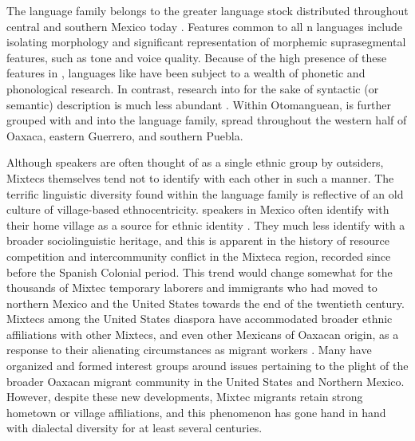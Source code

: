 \documentclass[output=paper,modfonts,nonflat]{langsci/langscibook}
\begin{document}
The  language family belongs to the greater  language stock distributed throughout central and southern Mexico today \citep{Rensch1976}.  Features common to all n languages include isolating morphology and significant representation of morphemic suprasegmental features, such as tone and voice quality.  Because of the high presence of these features in , languages like  have been subject to a wealth of phonetic and phonological research. In contrast, research into  for the sake of syntactic (or semantic) description is much less abundant \citep{Bradley1988}.  Within Otomanguean,  is further grouped with  and  into the  language family, spread throughout the western half of Oaxaca, eastern Guerrero, and southern Puebla.

Although  speakers are often thought of as a single ethnic group by outsiders, Mixtecs themselves tend not to identify with each other in such a manner.  The terrific linguistic diversity found within the  language family is reflective of an old culture of village-based ethnocentricity.   speakers in Mexico often identify with their home village as a source for ethnic identity \citep[221--223]{Spores2013}.  They much less identify with a broader  sociolinguistic heritage, and this is apparent in the history of resource competition and intercommunity conflict in the Mixteca region, recorded since before the Spanish Colonial period.  This trend would change somewhat for the thousands of Mixtec temporary laborers and immigrants who had moved to northern Mexico and the United States towards the end of the twentieth century.  Mixtecs among the United States diaspora have accommodated broader ethnic affiliations with other Mixtecs, and even other Mexicans of Oaxacan origin, as a response to their alienating circumstances as migrant workers \citep[228--235]{VelascoOrtiz2005,Spores2013}.  Many have organized and formed interest groups around issues pertaining to the plight of the broader Oaxacan migrant community in the United States and Northern Mexico.  However, despite these new developments, Mixtec migrants retain strong hometown or village affiliations, and this phenomenon has gone hand in hand with  dialectal diversity for at least several centuries.
\end{document}
